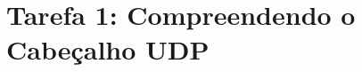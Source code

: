 \section*{Tarefa 1: Compreendendo o Cabeçalho UDP}

\begin{questions}
   
   
   
   
   
   
   
   
   
\end{questions}